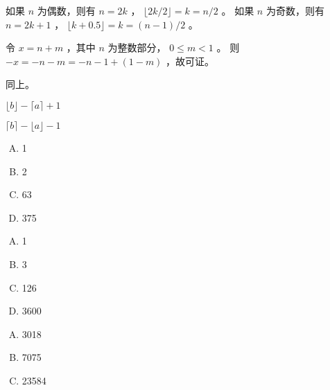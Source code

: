 {{        %
        \begin{practices}
            如果 $n$ 为偶数，则有 $n = 2k$ ， $\lfloor 2k / 2 \rfloor = k = n / 2$ 。
            如果 $n$ 为奇数，则有 $n = 2k + 1$ ， $\lfloor k + 0.5 \rfloor = k = (n - 1) / 2$ 。
        \end{practices}

        \begin{practices}
            令 $x = n + m$ ，其中 $n$ 为整数部分， $0 \leq m < 1$ 。
            则 $-x = -n - m = -n - 1 + (1 - m)$ ，故可证。
        \end{practices}

        \begin{practices}
            同上。
        \end{practices}

        \begin{practices}
            $\lfloor b \rfloor - \lceil a \rceil + 1$
        \end{practices}

        \begin{practices}
            $\lceil b \rceil - \lfloor a \rfloor - 1$
        \end{practices}

        \begin{practices}
            \begin{enumerate}[A.]
                \item 1
                \item 2
                \item 63
                \item 375
            \end{enumerate}
        \end{practices}

        \begin{practices}
            \begin{enumerate}[A.]
                \item 1
                \item 3
                \item 126
                \item 3600
            \end{enumerate}
        \end{practices}

        \begin{practices}
            \begin{enumerate}[A.]
                \item 3018
                \item 7075
                \item 23584
            \end{enumerate}
        \end{practices}

}}
